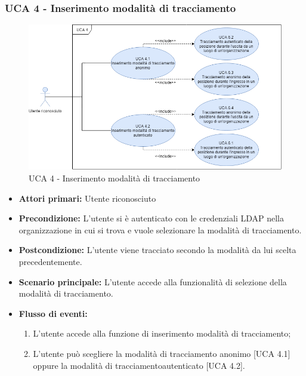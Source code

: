 \subsubsection{UCA 4 - Inserimento modalità di tracciamento}%

\begin{figure}[h]
	\centering	
	\includegraphics[scale=0.53, center]{sezioni/UseCase/Immagini/UCA4.png}
	\caption{UCA 4 - Inserimento modalità di tracciamento}
\end{figure}

\begin{itemize}
	\item \textbf{Attori primari:} Utente riconosciuto
	\item \textbf{Precondizione:} L'utente si è autenticato con le credenziali LDAP nella organizzazione in cui si trova e vuole selezionare la modalità di tracciamento.
	\item \textbf{Postcondizione:} L'utente viene tracciato secondo la modalità da lui scelta precedentemente.
	\item \textbf{Scenario principale:} L'utente accede alla funzionalità di selezione della modalità di tracciamento.
	\item \textbf{Flusso di eventi:}
	\begin{enumerate}
		\item L'utente accede alla funzione di inserimento modalità di tracciamento;
		\item L'utente può scegliere la modalità di tracciamento anonimo\ap{G} [UCA 4.1] oppure la modalità di tracciamentoautenticato [UCA 4.2].
	\end{enumerate}
\end{itemize}

